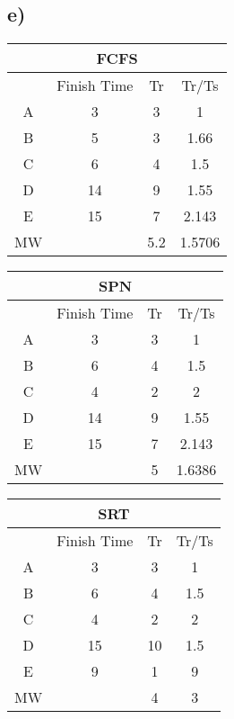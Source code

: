 \documentclass[a4paper,12pt]{article}
\begin{document}
\subsection*{e)}

\begin{center}
\renewcommand{\arraystretch}{1.2}
\begin{tabular}{|c|c|c|c|}
\multicolumn{4}{c}{\textbf{FCFS}} \\
\hline
 & Finish Time & Tr & Tr/Ts \\
\hline
A & 3 & 3 & 1\\
\hline
B & 5 & 3 & 1.66\\
\hline
C & 6 & 4 & 1.5\\
\hline
D & 14 & 9 & 1.55\\
\hline
E & 15 & 7 & 2.143\\
\hline
MW & & 5.2 & 1.5706  \\
\hline
\end{tabular}
\end{center}

\begin{center}
\renewcommand{\arraystretch}{1.2}
\begin{tabular}{|c|c|c|c|}
\multicolumn{4}{c}{\textbf{SPN}} \\
\hline
 & Finish Time & Tr & Tr/Ts \\
\hline
A & 3 & 3 & 1\\
\hline
B & 6 & 4 & 1.5\\
\hline
C & 4 & 2 & 2\\
\hline
D & 14 & 9 &  1.55\\
\hline
E & 15 & 7 & 2.143\\
\hline
MW & & 5 & 1.6386  \\
\hline
\end{tabular}
\end{center}


\begin{center}
\renewcommand{\arraystretch}{1.2}
\begin{tabular}{|c|c|c|c|}
\multicolumn{4}{c}{\textbf{SRT}} \\
\hline
 & Finish Time & Tr & Tr/Ts \\
\hline
A & 3 & 3 & 1\\
\hline
B & 6 & 4 & 1.5\\
\hline
C & 4 & 2 & 2\\
\hline
D & 15 & 10 &  1.5\\
\hline
E & 9 & 1 & 9\\
\hline
MW & & 4 & 3 \\
\hline
\end{tabular}
\end{center}
\end{document}

